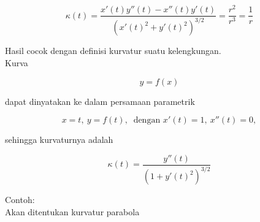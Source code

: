 \documentclass[12pt,arial,letterpaper]{book}
\begin{document}
\begin{eulernootebook}
\begin{eulercomment}
\begin{eulercomment}
\begin{eulernootebook}
\begin{eulercomment}
\begin{eulercomment}
\begin{eulercomment}
\begin{eulercomment}
\begin{eulercomment}
\begin{eulercomment}
\begin{eulernotebook}
\begin{eulercomment}
\begin{eulercomment}
\begin{eulercomment}
\begin{eulercomment}
\begin{eulercomment}
\begin{eulercomment}
\begin{eulercomment}
\begin{eulercomment}
\begin{eulercomment}
\begin{eulercomment}
\begin{eulercomment}
\begin{eulercomment}
\begin{eulercomment}
\begin{eulercomment}
\begin{eulercomment}
\begin{eulercomment}
\begin{eulercomment}
\begin{eulercomment}
\begin{eulercomment}
\begin{eulercomment}
\begin{eulercomment}
\end{eulercomment}
\begin{eulerformula}
\[
\kappa(t)=\frac{x'(t)y''(t)-x''(t)y'(t)}{\left(x'(t)^2+y'(t)^2\right)^{3/2}}=\frac{r^2}{r^3}=\frac 1 r
\]
\end{eulerformula}
\begin{eulercomment}
Hasil cocok dengan definisi kurvatur suatu kelengkungan.\\
Kurva

\end{eulercomment}
\begin{eulerformula}
\[
y=f(x)
\]
\end{eulerformula}
\begin{eulercomment}
dapat dinyatakan ke dalam persamaan parametrik

\end{eulercomment}
\begin{eulerformula}
\[
x=t,\ y=f(t),\ \text{ dengan } x'(t)=1,\ x''(t)=0,
\]
\end{eulerformula}
\begin{eulercomment}
sehingga kurvaturnya adalah

\end{eulercomment}
\begin{eulerformula}
\[
\kappa(t) = \frac{y''(t)}{\left(1+y'(t)^2\right)^{3/2}}
\]
\end{eulerformula}
\begin{eulercomment}
Contoh:\\
Akan ditentukan kurvatur parabola


\end{eulercomment}
\end{eulercomment}
\end{eulercomment}
\end{eulercomment}
\end{eulercomment}
\end{eulercomment}
\end{eulercomment}
\end{eulercomment}
\end{eulercomment}
\end{eulercomment}
\end{eulercomment}
\end{eulercomment}
\end{eulercomment}
\end{eulercomment}
\end{eulercomment}
\end{eulercomment}
\end{eulercomment}
\end{eulercomment}
\end{eulercomment}
\end{eulercomment}
\end{eulercomment}
\end{eulernotebook}
\end{eulercomment}
\end{eulercomment}
\end{eulercomment}
\end{eulercomment}
\end{eulercomment}
\end{eulercomment}
\end{eulernootebook}
\end{eulercomment}
\end{eulercomment}
\end{eulernootebook}
\end{document}
